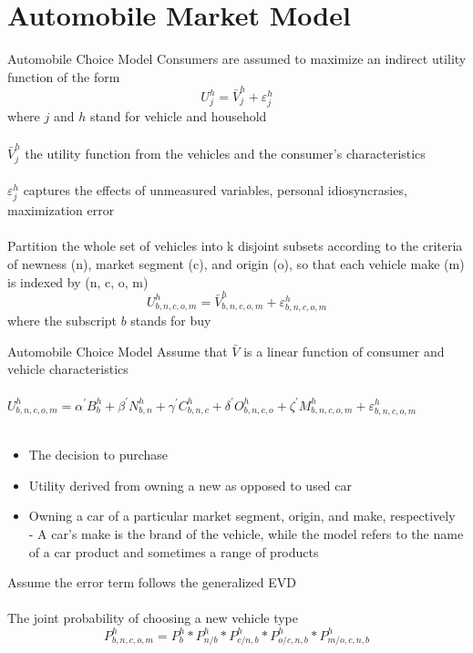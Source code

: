 \documentclass{beamer}
\begin{document}
\section{Automobile Market Model}
\begin{frame}{Automobile Choice Model}
Consumers are assumed to maximize an indirect utility function of the form
$$U_{j}^{h}=\bar{V}_{j}^{h}+\varepsilon_{j}^{h}$$
where $j$ and $h$ stand for vehicle and household \\~\\
$\bar{V}_{j}^{h}$ the utility function from the vehicles and the consumer's characteristics \\~\\
$\varepsilon_{j}^{h}$ captures the effects of unmeasured variables, personal idiosyncrasies, maximization error \\~\\
Partition the whole set of vehicles into k disjoint subsets according to the criteria of newness (n), market segment (c), and origin (o), so that each vehicle make (m) is indexed by (n, c, o, m)
$$U_{b, n, c, o, m}^{h}=\bar{V}_{b, n, c, o, m}^{h}+\varepsilon_{b, n, c, o, m}^{h}$$
where the subscript $b$ stands for buy
\end{frame}
\begin{frame}{Automobile Choice Model}
Assume that $\bar{V}$ is a linear function of consumer and vehicle characteristics \\~\\
$U_{b, n, c, o, m}^{h}= \alpha^{\prime} B_{b}^{h}+\beta^{\prime} N_{b, n}^{h}+\gamma^{\prime} C_{b, n, c}^{h}+\delta^{\prime} O_{b, n, c, o}^{h}+\zeta^{\prime} M_{b, n, c, o, m}^{h}+\varepsilon_{b, n, c, o, m}^{h}$ \\~\\
\begin{itemize}
	\item The decision to purchase
	\item Utility derived from owning a new as opposed to used car
	\item Owning a car of a particular market segment, origin, and make, respectively \\
	- A car's make is the brand of the vehicle, while the model refers to the name of a car product and sometimes a range of products
\end{itemize}
Assume the error term follows the generalized EVD \\~\\
The joint probability of choosing a new vehicle type
$$P_{b, n, c, o, m}^{h}=P_{b}^{h} * P_{n / b}^{h} * P_{c / n, b}^{h} * P_{o / c, n, b}^{h} * P_{m / o, c, n, b}^{h}$$
\end{frame}
\end{document}
